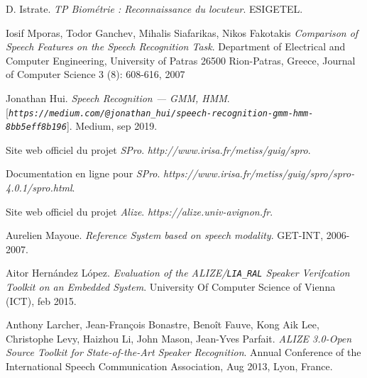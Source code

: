 \documentclass[a4paper, 12pt]{book}
\begin{document}
\begin{thebibliography}{9}
D. Istrate.
\textit{TP Biométrie : Reconnaissance du locuteur}. 
ESIGETEL.

Iosif Mporas, Todor Ganchev, Mihalis Siafarikas, Nikos Fakotakis
\textit{Comparison of Speech Features on the Speech Recognition Task}. 
Department of Electrical and Computer Engineering, University of Patras 26500 Rion-Patras, Greece, Journal of Computer Science 3 (8): 608-616, 2007

Jonathan Hui.
\textit{Speech Recognition — GMM, HMM}.
[\textit{\texttt{https://medium.com/@jonathan\_hui/speech-recognition-gmm-hmm-8bb5eff8b196}}].
Medium, sep 2019.

Site web officiel du projet \textit{SPro}.
\textit{http://www.irisa.fr/metiss/guig/spro}.

Documentation en ligne pour \textit{SPro}.
\textit{https://www.irisa.fr/metiss/guig/spro/spro-4.0.1/spro.html}.

Site web officiel du projet \textit{Alize}.
\textit{https://alize.univ-avignon.fr}.

Aurelien Mayoue. 
\textit{Reference System based on speech modality}. 
GET-INT, 2006-2007.

Aitor Hernández López. 
\textit{Evaluation of the ALIZE/\texttt{LIA\_RAL} Speaker Verifcation Toolkit on an Embedded System}. 
University Of Computer Science of Vienna (ICT), feb 2015.

Anthony Larcher, Jean-François Bonastre, Benoît Fauve, Kong Aik Lee, Christophe Levy, Haizhou Li, John Mason, Jean-Yves Parfait.
\textit{ALIZE 3.0-Open Source Toolkit for State-of-the-Art Speaker Recognition}. 
Annual Conference of the International Speech Communication Association, Aug 2013, Lyon, France.
\end{thebibliography}

%
%
\end{document}
